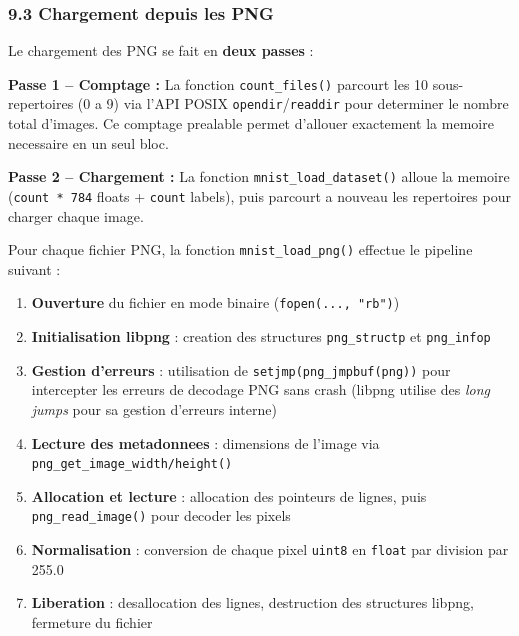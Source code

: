 \documentclass[
  letterpaper,
  DIV=11,
  numbers=noendperiod]{scrartcl}
\providecommand{\tightlist}{%
  \setlength{\itemsep}{0pt}\setlength{\parskip}{0pt}}
\begin{document}
\subsubsection{9.3 Chargement depuis les PNG}\label{chargement-png}

Le chargement des PNG se fait en \textbf{deux passes} :

\textbf{Passe 1 -- Comptage :} La fonction \texttt{count\_files()} parcourt les 10 sous-repertoires (0 a 9) via l'API POSIX \texttt{opendir}/\texttt{readdir} pour determiner le nombre total d'images. Ce comptage prealable permet d'allouer exactement la memoire necessaire en un seul bloc.

\textbf{Passe 2 -- Chargement :} La fonction \texttt{mnist\_load\_dataset()} alloue la memoire (\texttt{count * 784} floats + \texttt{count} labels), puis parcourt a nouveau les repertoires pour charger chaque image.

Pour chaque fichier PNG, la fonction \texttt{mnist\_load\_png()} effectue le pipeline suivant :

\begin{enumerate}
\def\labelenumi{\arabic{enumi}.}
\tightlist
\item \textbf{Ouverture} du fichier en mode binaire (\texttt{fopen(..., "rb")})
\item \textbf{Initialisation libpng} : creation des structures \texttt{png\_structp} et \texttt{png\_infop}
\item \textbf{Gestion d'erreurs} : utilisation de \texttt{setjmp(png\_jmpbuf(png))} pour intercepter les erreurs de decodage PNG sans crash (libpng utilise des \emph{long jumps} pour sa gestion d'erreurs interne)
\item \textbf{Lecture des metadonnees} : dimensions de l'image via \texttt{png\_get\_image\_width/height()}
\item \textbf{Allocation et lecture} : allocation des pointeurs de lignes, puis \texttt{png\_read\_image()} pour decoder les pixels
\item \textbf{Normalisation} : conversion de chaque pixel \texttt{uint8} en \texttt{float} par division par 255.0
\item \textbf{Liberation} : desallocation des lignes, destruction des structures libpng, fermeture du fichier
\end{enumerate}
\end{document}

